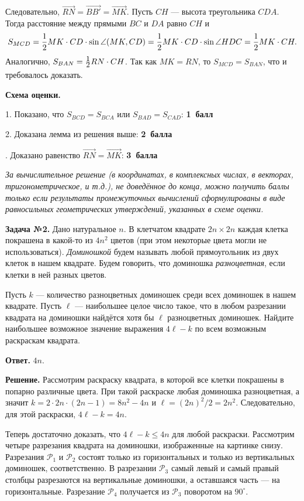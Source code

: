 \documentclass[12pt]{article}
\def\avtor#1{\linebreak[2] \hspace*{\fill}{\small (\mbox{\textit{#1})}}}
\def \Problem#1{\par \bigskip \textbf{Задача №{#1}. }}
\def \solution{\par \bigskip \textbf{Решение. }}
\def \answer{\par \bigskip \textbf{Ответ. }}
\def \marking{\par \bigskip \textbf{Схема оценки. }}
\def\leq{\leqslant}
\def\frac#1#2{\mathchoice{#1\over#2}{\hbox{\small$#1$}\over\mathstrut\hbox{\small$#2$}}{#1\over#2}{#1\over#2}}
\begin{document}
Следовательно,  $\overrightarrow{RN} =\overrightarrow{BB'}=\overrightarrow{MK}$. Пусть $CH$ --- высота треугольника $CDA$. Тогда расстояние между прямыми $BC$ и $DA$ равно $CH$ и
$$
S_{MCD}
=
\frac{1}{2} MK \cdot CD \cdot \sin \angle(MK,CD) 
=
\frac{1}{2} MK \cdot CD \cdot \sin \angle HDC 
=
\frac{1}{2} MK \cdot CH
.
$$
Аналогично, $S_{BAN}=\frac{1}{2}RN \cdot CH$. Так как $MK=RN$, то $S_{MCD}=S_{BAN}$, что и требовалось доказать.

\marking

1. Показано, что $S_{BCD}=S_{BCA}$ или $S_{BAD}=S_{CAD}$: \dotfill\textbf{1~балл}

2. Доказана лемма из решения выше: \dotfill\textbf{2~балла}

. Доказано равенство $\overrightarrow{RN} =\overrightarrow{MK}$: \dotfill\textbf{3~балла}

\smallskip

\textit{За вычислительное решение (в координатах, в комплексных числах, в векторах, тригонометрическое, и т.д.), не доведённое до конца, можно получить баллы только если результаты промежуточных вычислений сформулированы в виде равносильных геометрических утверждений, указанных в схеме оценки.}


\Problem{2} Дано натуральное $n$. В клетчатом квадрате $2n\times 2n$  каждая клетка покрашена в какой-то из $4n^2$ цветов (при этом некоторые цвета могли не использоваться). \textit{Доминошкой} будем называть любой прямоугольник из двух клеток в нашем квадрате. Будем говорить, что доминошка \textit{разноцветная}, если клетки в ней разных цветов.

Пусть $k$ --- количество разноцветных доминошек среди всех доминошек в нашем квадрате. Пусть $\ell$ --- наибольшее целое число такое, что в любом разрезании квадрата на доминошки найдётся хотя бы $\ell$ разноцветных доминошек. Найдите наибольшее возможное значение выражения $4\ell - k$ по всем возможным раскраскам квадрата. \avtor{Богданов~И.}

\answer $4n$.

\solution Рассмотрим раскраску квадрата, в которой все клетки покрашены в попарно различные цвета. При такой раскраске любая доминошка разноцветная, а значит $k = 2 \cdot 2n \cdot (2n - 1) = 8 n^2 - 4 n$ и $\ell = (2n)^2 / 2 = 2 n^2$. Следовательно, для этой раскраски, $4 \ell - k = 4 n$.

Теперь достаточно доказать, что $4 \ell - k \leq 4n$ для любой раскраски. Рассмотрим четыре разрезания квадрата на доминошки, изображенные на картинке снизу. Разрезания $\mathcal P_1$ и $\mathcal P_2$ состоят только из горизонтальных и только из вертикальных доминошек, соответственно. В разрезании $\mathcal P_3$ самый левый и самый правый столбцы разрезаются на вертикальные доминошки, а оставшаяся часть --- на горизонтальные. Разрезание $\mathcal P_4$ получается из $\mathcal P_3$ поворотом на $90^\circ$. 
\end{document}
